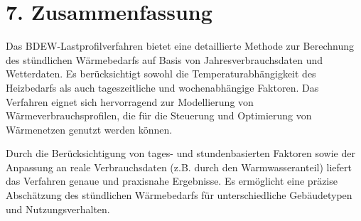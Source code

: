 \documentclass{article}
\begin{document}
\section*{7. Zusammenfassung}
Das BDEW-Lastprofilverfahren bietet eine detaillierte Methode zur Berechnung des stündlichen Wärmebedarfs auf Basis von Jahresverbrauchsdaten und Wetterdaten. Es berücksichtigt sowohl die Temperaturabhängigkeit des Heizbedarfs als auch tageszeitliche und wochenabhängige Faktoren. Das Verfahren eignet sich hervorragend zur Modellierung von Wärmeverbrauchsprofilen, die für die Steuerung und Optimierung von Wärmenetzen genutzt werden können.

Durch die Berücksichtigung von tages- und stundenbasierten Faktoren sowie der Anpassung an reale Verbrauchsdaten (z.B. durch den Warmwasseranteil) liefert das Verfahren genaue und praxisnahe Ergebnisse. Es ermöglicht eine präzise Abschätzung des stündlichen Wärmebedarfs für unterschiedliche Gebäudetypen und Nutzungsverhalten.
\end{document}
